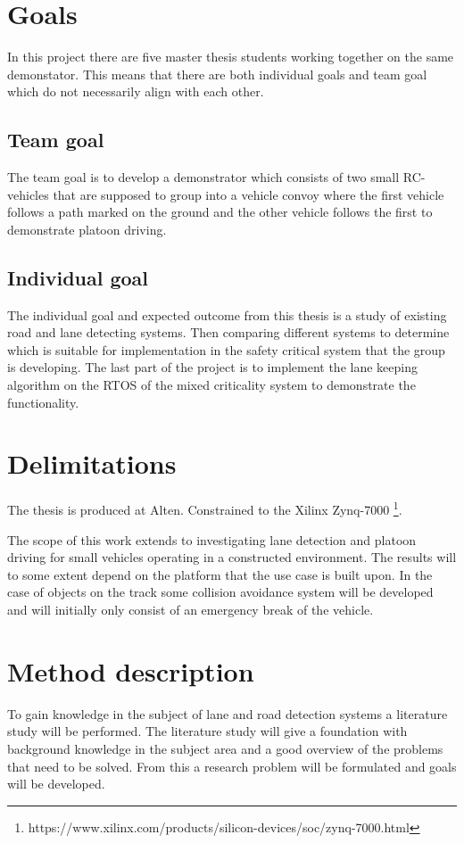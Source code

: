 \section{Goals}
In this project there are five master thesis students working together on the same demonstator. This means that there are both individual goals and team goal which do not necessarily align with each other.

\subsection{Team goal}
The team goal is to develop a demonstrator which consists of two small RC-vehicles that are supposed to group into a vehicle convoy where the first vehicle follows a path marked on the ground and the other vehicle follows the first to demonstrate platoon driving.

\subsection{Individual goal}
The individual goal and expected outcome from this thesis is a study of existing road and lane detecting systems. Then comparing different systems to determine which is suitable for implementation in the safety critical system that the group is developing. The last part of the project is to implement the lane keeping algorithm on the RTOS of the mixed criticality system to demonstrate the functionality.

\section{Delimitations}
The thesis is produced at Alten.
Constrained to the Xilinx Zynq-7000 \footnote{https://www.xilinx.com/products/silicon-devices/soc/zynq-7000.html}.

The scope of this work extends to investigating lane detection and platoon driving for small vehicles operating in a constructed environment. The results will to some extent depend on the platform that the use case is built upon. In the case of objects on the track some collision avoidance system will be developed and will initially only consist of an emergency break of the vehicle.

\section{Method description}
To gain knowledge in the subject of lane and road detection systems a literature study will be performed. The literature study will give a foundation with background knowledge in the subject area and a good overview of the problems that need to be solved. From this a research problem will be formulated and goals will be developed. 

